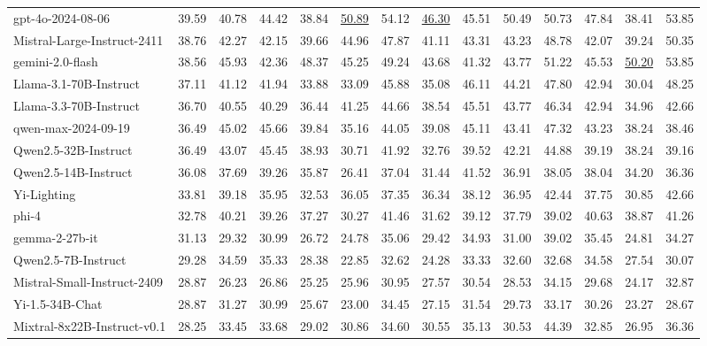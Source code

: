 {\begin{table}[H]
{\begin{tabular}{lccccccccccccc}
\rowcolor{color22}
gpt-4o-2024-08-06& 39.59& 40.78& 44.42& 38.84& \underline{50.89}& 54.12& \underline{46.30}& 45.51& 50.49& 50.73& 47.84& 38.41& 53.85 \\
\rowcolor{color22}
Mistral-Large-Instruct-2411& 38.76& 42.27& 42.15& 39.66& 44.96& 47.87& 41.11& 43.31& 43.23& 48.78& 42.07& 39.24& 50.35 \\
\rowcolor{color22}
gemini-2.0-flash& 38.56& 45.93& 42.36& 48.37& 45.25& 49.24& 43.68& 41.32& 43.77& 51.22& 45.53& \underline{50.20}& 53.85 \\
\rowcolor{color22}
Llama-3.1-70B-Instruct& 37.11& 41.12& 41.94& 33.88& 33.09& 45.88& 35.08& 46.11& 44.21& 47.80& 42.94& 30.04& 48.25 \\
\rowcolor{color22}
Llama-3.3-70B-Instruct& 36.70& 40.55& 40.29& 36.44& 41.25& 44.66& 38.54& 45.51& 43.77& 46.34& 42.94& 34.96& 42.66 \\
\rowcolor{color22}
qwen-max-2024-09-19& 36.49& 45.02& 45.66& 39.84& 35.16& 44.05& 39.08& 45.11& 43.41& 47.32& 43.23& 38.24& 38.46 \\
\rowcolor{color22}
Qwen2.5-32B-Instruct& 36.49& 43.07& 45.45& 38.93& 30.71& 41.92& 32.76& 39.52& 42.21& 44.88& 39.19& 38.24& 39.16 \\
\rowcolor{color22}
Qwen2.5-14B-Instruct& 36.08& 37.69& 39.26& 35.87& 26.41& 37.04& 31.44& 41.52& 36.91& 38.05& 38.04& 34.20& 36.36 \\
\rowcolor{color22}
Yi-Lighting& 33.81& 39.18& 35.95& 32.53& 36.05& 37.35& 36.34& 38.12& 36.95& 42.44& 37.75& 30.85& 42.66 \\
\rowcolor{color22}
phi-4& 32.78& 40.21& 39.26& 37.27& 30.27& 41.46& 31.62& 39.12& 37.79& 39.02& 40.63& 38.87& 41.26 \\
\rowcolor{color22}
gemma-2-27b-it& 31.13& 29.32& 30.99& 26.72& 24.78& 35.06& 29.42& 34.93& 31.00& 39.02& 35.45& 24.81& 34.27 \\
\rowcolor{color22}
Qwen2.5-7B-Instruct& 29.28& 34.59& 35.33& 28.38& 22.85& 32.62& 24.28& 33.33& 32.60& 32.68& 34.58& 27.54& 30.07 \\
\rowcolor{color22}
Mistral-Small-Instruct-2409& 28.87& 26.23& 26.86& 25.25& 25.96& 30.95& 27.57& 30.54& 28.53& 34.15& 29.68& 24.17& 32.87 \\
\rowcolor{color22}
Yi-1.5-34B-Chat& 28.87& 31.27& 30.99& 25.67& 23.00& 34.45& 27.15& 31.54& 29.73& 33.17& 30.26& 23.27& 28.67 \\
\rowcolor{color22}
Mixtral-8x22B-Instruct-v0.1& 28.25& 33.45& 33.68& 29.02& 30.86& 34.60& 30.55& 35.13& 30.53& 44.39& 32.85& 26.95& 36.36 \\

\end{tabular}}
\end{table}}
